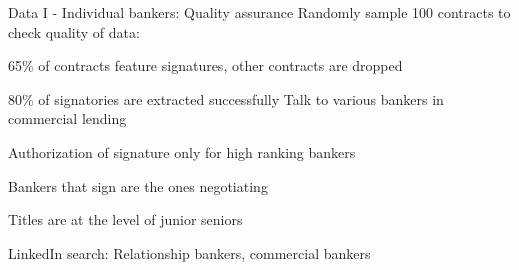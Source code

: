 \documentclass[notes,11pt, aspectratio=169]{beamer}
\newenvironment{wideitemize}{\itemize\addtolength{\itemsep}{10pt}  \setlength\itemsep{.5em}}{\enditemize}
\begin{document}
\begin{frame}[label=appendix_bankers]{Data I - Individual bankers: Quality assurance}
Randomly sample 100 contracts to check quality of data:
\begin{wideitemize}
  \item 65\% of contracts feature signatures, other contracts are dropped
  \item 80\% of signatories are extracted successfully
\end{wideitemize}
\vspace{.3cm}
Talk to various bankers in commercial lending
\begin{wideitemize}
  \item Authorization of signature only for high ranking bankers
  \item Bankers that sign are the ones negotiating
  \item Titles are at the level of junior seniors
  \item LinkedIn search: Relationship bankers, commercial bankers     
\end{wideitemize}
\hfill \hyperlink{data_bankers}{}
\end{frame}
\end{document}
